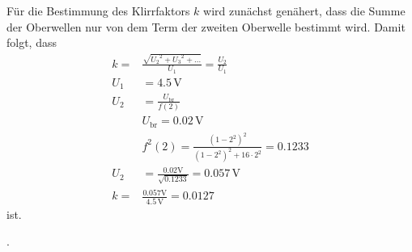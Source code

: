 Für die Bestimmung des Klirrfaktors $k$ wird zunächst genähert, dass die Summe der
Oberwellen nur von dem Term der zweiten Oberwelle bestimmt wird. Damit folgt, dass
\begin{align}
  k = & \frac{\sqrt{{U_2}^2 + {U_3}^2 + ...}}{U_1} = \frac{U_2}{U_1}  \\
  U_1 & = 4.5 \, \text{V}    \\
  U_2 & = \frac{U_\text{br}}{f(2)}    \\
      & U_\text{br} = 0.02 \, \text{V}   \\
      & f^2(2) = \frac{(1 - 2^2)^2}{(1 - 2^2)^2 + 16 \cdot 2^2} = 0.1233  \\
  U_2 & = \frac{0.02 \text{V}}{\sqrt{0.1233}} = 0.057 \, \text{V}  \\
  k = & \frac{0.057 \text{V}}{4.5 \, \text{V}} = 0.0127
\end{align}
ist.








.
